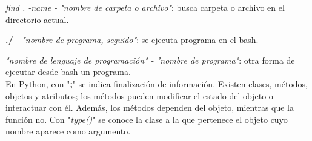\documentclass[etterpaper, 12pt, oneside]{article}%
\begin{document}
	\emph{find . -name - "nombre de carpeta o archivo"}: busca carpeta o archivo en el directorio actual.
	
	\textbf{./} \emph{- "nombre de programa, seguido"}: se ejecuta programa en el bash.
	
	\emph{"nombre de lenguaje de programación" - "nombre de programa"}: otra forma de ejecutar desde bash un programa.\\
	
	En Python, con "\textbf{;}" se indica finalización de información.
	Existen clases, métodos, objetos y atributos; los métodos pueden modificar el estado del objeto o interactuar con él. Además, los métodos dependen del objeto, mientras que la función no. Con "\emph{type()}" se conoce la clase a la que pertenece el objeto cuyo nombre aparece como argumento.
	
	
	

	
\end{document}
